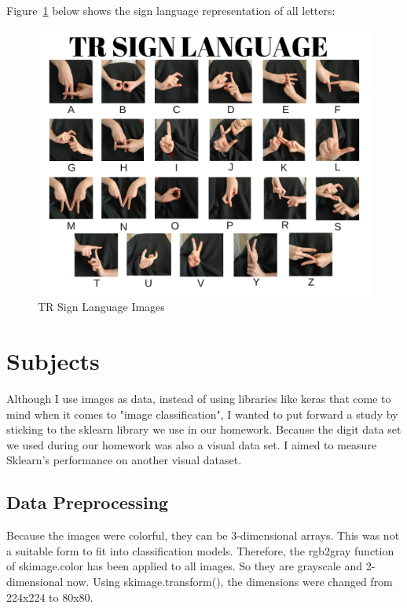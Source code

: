 \documentclass{article}
\begin{document}
\begin{flushleft}
\vspace{2mm}
Figure~\ref{fig:tr_sign_language} below shows the sign language representation of all letters:

\begin{figure}[h]
    \centering
    \includegraphics[scale=0.25]{images/tr sign language.png}
    \caption{TR Sign Language Images}
    \label{fig:tr_sign_language}
\end{figure}
\newpage

\section{Subjects}
\label{subjects}
Although I use images as data, instead of using libraries like keras that come to mind when it comes to "image classification", I wanted to put forward a study by sticking to the sklearn library we use in our homework. Because the digit data set we used during our homework was also a visual data set. I aimed to measure Sklearn's performance on another visual dataset.

\subsection{Data Preprocessing}
Because the images were colorful, they can be 3-dimensional arrays. This was not a suitable form to fit into classification models. Therefore, the rgb2gray function of skimage.color has been applied to all images. So they are grayscale and 2-dimensional now. Using skimage.transform(), the dimensions were changed from 224x224 to 80x80.


\end{flushleft}
\end{document}
